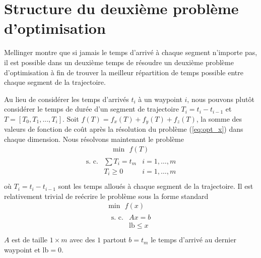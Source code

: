 \section{Structure du deuxième problème d'optimisation}

Mellinger montre que si jamais le temps d'arrivé à chaque segment n'importe pas, il est possible dans un deuxième temps de résoudre un deuxième problème d'optimisation à fin de trouver la meilleur répartition de temps possible entre chaque segment de la trajectoire.

Au lieu de considérer les temps d'arrivés $t_i$ à un waypoint $i$, nous pouvons plutôt considérer le temps de durée d'un segment de trajectoire $T_i = t_i - t_{i-1}$ et $T = [T_0, T_1, ..., T_i]$. Soit $f(T) = f_x(T) +  f_y(T) + f_z(T)$, la somme des valeurs de fonction de coût après la résolution du problème (\ref{eq:opt_x}) dans chaque dimension. Nous résolvons maintenant le problème
\begin{align}\label{eq:time_opt}
\text{min}\ \ \ f(T)
\end{align}\begin{align*}
\begin{array}{lll}
\text{s. c.} & \sum T_i = t_m & i = 1,\ldots,m\\
& T_i \geq 0 &  i = 1,\ldots,m\\
\end{array}
\end{align*}
où $T_i = t_i - t_{i-1}$ sont les temps alloués à chaque segment de la trajectoire. Il est relativement trivial de reécrire le problème sous la forme standard
\begin{align*}
\text{min}\ \ \ f(x)\\
\begin{array}{lll}
\text{s. c.} & Ax = b\\
& \text{lb} \leq x\\
\end{array}
\end{align*}
$A$ est de taille $1 \times m$ avec des $1$ partout $b = t_m$ le temps d'arrivé au dernier waypoint et lb$=0$. 

